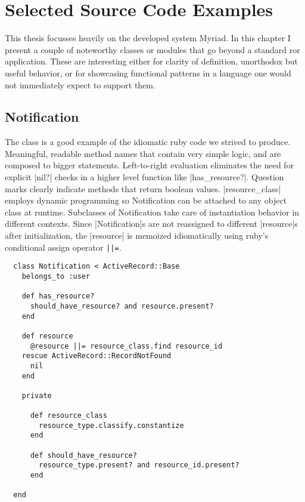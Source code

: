 \chapter{Selected Source Code Examples}
\label{chapter:CodeExamples}

This thesis focusses heavily on the developed system Myriad. In this chapter I present a couple of noteworthy classes or modules that go beyond a standard \gls{ror} application. These are interesting either for clarity of definition, unorthodox but useful behavior, or for showcasing functional patterns in a language one would not immediately expect to support them.

\section{Notification}

The  class is a good example of the idiomatic \gls{ruby} code we strived to produce. Meaningful, readable method names that contain very simple logic, and are composed to bigger statements. Left-to-right evaluation eliminates the need for explicit |nil?| checks in a higher level function like |has_resource?|. Question marks clearly indicate methods that return boolean values. |resource_class| employs dynamic programming so Notification can be attached to any object class at runtime. Subclasses of Notification take care of instantiation behavior in different contexts. Since |Notification|s are not reassigned to different |resource|s after initialization, the |resource| is memoized idiomatically using \gls{ruby}'s conditional assign operator \lstinline{||=}.

\begin{lstlisting}
  class Notification < ActiveRecord::Base
    belongs_to :user

    def has_resource?
      should_have_resource? and resource.present?
    end

    def resource
      @resource ||= resource_class.find resource_id
    rescue ActiveRecord::RecordNotFound
      nil
    end
    
    private
  
      def resource_class
        resource_type.classify.constantize
      end
    
      def should_have_resource?
        resource_type.present? and resource_id.present?
      end
   
  end
\end{lstlisting}

